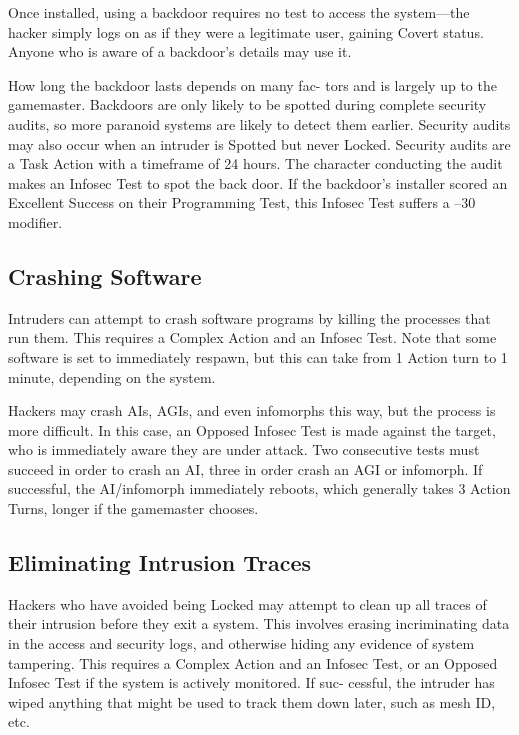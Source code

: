Once installed, using a backdoor requires no test to 
access the system—the hacker simply logs on as if they 
were a legitimate user, gaining Covert status. Anyone 
who is aware of a backdoor's details may use it.

How long the backdoor lasts depends on many fac-
tors and is largely up to the gamemaster. Backdoors 
are only likely to be spotted during complete security 
audits, so more paranoid systems are likely to detect 
them earlier. Security audits may also occur when an 
intruder is Spotted but never Locked. Security audits 
are a Task Action with a timeframe of 24 hours. The 
character conducting the audit makes an Infosec 
Test to spot the back door. If the backdoor's installer 
scored an Excellent Success on their Programming 
Test, this Infosec Test suffers a –30 modifier.

\subsection{Crashing Software}

Intruders can attempt to crash software programs 
by killing the processes that run them. This requires a 
Complex Action and an Infosec Test. Note that some 
software is set to immediately respawn, but this can take 
from 1 Action turn to 1 minute, depending on the system.

Hackers may crash AIs, AGIs, and even infomorphs 
this way, but the process is more difficult. In this case, 
an Opposed Infosec Test is made against the target, 
who is immediately aware they are under attack. Two 
consecutive tests must succeed in order to crash an AI, 
three in order crash an AGI or infomorph. If successful, 
the AI/infomorph immediately reboots, which generally 
takes 3 Action Turns, longer if the gamemaster chooses.

\subsection{Eliminating Intrusion Traces}

Hackers who have avoided being Locked may attempt 
to clean up all traces of their intrusion before they 
exit a system. This involves erasing incriminating data 
in the access and security logs, and otherwise hiding 
any evidence of system tampering. This requires a 
Complex Action and an Infosec Test, or an Opposed 
Infosec Test if the system is actively monitored. If suc-
cessful, the intruder has wiped anything that might be 
used to track them down later, such as mesh ID, etc.

